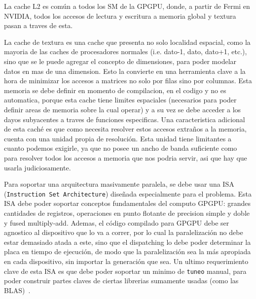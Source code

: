 La cache L2 es com\'un a todos los SM de la GPGPU, donde, a partir de Fermi en NVIDIA, todos
los accesos de lectura y escritura a memoria global y textura pasan a traves de esta. ~\cite{NvidiaFermi}

La cache de textura es una cache que presenta no solo localidad espacial, como la mayoria
de las caches de procesadores normales (i.e. dato-1, dato, dato+1, etc.), sino que se le
puede agregar el concepto de dimensiones, para poder modelar datos en mas de una dimension.
Esto la convierte en una herramienta clave a la hora de minimizar los accesos a matrices
no solo por filas sino por columnas. Esta memoria se debe definir en momento de compilacion,
en el codigo y no es automatica, porque esta cache tiene limites espaciales (necesarios
para poder definir areas de memoria sobre la cual operar) y a su vez se debe acceder
a los dayos subyacentes a traves de funciones especificas. Una caracteristica adicional
de esta cach\'e es que como necesita resolver estos accesos extra\~nos a la memoria, cuenta
con una unidad propia de resoluci\'on. Esta unidad tiene limitantes a cuanto podemos
exigirle, ya que no posee un ancho de banda suficiente como para resolver todos los
accesos a memoria que nos podria servir, asi que hay que usarla judiciosamente.

Para soportar una arquitectura masivamente paralela, se debe usar una ISA
(\texttt{Instruction Set Architecture}) dise\~nada especialmente para el problema. Esta ISA
debe poder soportar conceptos fundamentales del computo GPGPU: grandes cantidades de registros,
operaciones en punto flotante de precision simple y doble y fused multiply-add. Ademas,
el c\'odigo compilado para GPGPU debe ser agnostico al dispositivo que lo va a correr, por
lo cual la paralelizaci\'on no debe estar demasiado atada a este, sino que el dispatching
lo debe poder determinar la placa en tiempo de ejecuci\'on, de modo que la paralelizaci\'on
sea la m\'as apropiada en cada dispositivo, sin importar la generaci\'on que sea. Un ultimo
requerimiento clave de esta ISA es que debe poder soportar un minimo de \texttt{tuneo} manual,
para poder construir partes claves de ciertas librerias sumamente usadas (como las BLAS)~\cite{NvidiaFermi}.


